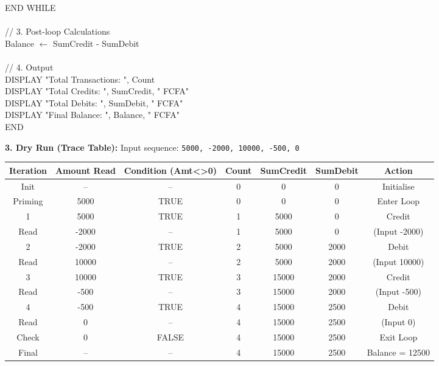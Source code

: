 \documentclass[11pt]{article}
\begin{document}
\begin{exoresolu}
\begin{flushleft}
\hspace{1em}END WHILE\\
\mbox{}\\
\hspace{1em}// 3. Post-loop Calculations\\
\hspace{1em}Balance $\leftarrow$ SumCredit - SumDebit\\
\mbox{}\\
\hspace{1em}// 4. Output\\
\hspace{1em}DISPLAY "Total Transactions: ", Count\\
\hspace{1em}DISPLAY "Total Credits: ", SumCredit, " FCFA"\\
\hspace{1em}DISPLAY "Total Debits: ", SumDebit, " FCFA"\\
\hspace{1em}DISPLAY "Final Balance: ", Balance, " FCFA"\\
END
\end{flushleft}

\noindent\textbf{3. Dry Run (Trace Table):}
Input sequence: \texttt{5000, -2000, 10000, -500, 0}

\begin{center}
\begin{tabular}{|c|c|c|c|c|c|c|}\hline
\rowcolor{popblueL}
\textbf{Iteration} & \textbf{Amount Read} & \textbf{Condition (Amt<>0)} & \textbf{Count} & \textbf{SumCredit} & \textbf{SumDebit} & \textbf{Action} \\ \hline
Init & -- & -- & 0 & 0 & 0 & Initialise \\ \hline
Priming & 5000 & TRUE & 0 & 0 & 0 & Enter Loop \\ \hline
1 & 5000 & TRUE & 1 & 5000 & 0 & Credit \\ \hline
Read & -2000 & -- & 1 & 5000 & 0 & (Input -2000) \\ \hline
2 & -2000 & TRUE & 2 & 5000 & 2000 & Debit \\ \hline
Read & 10000 & -- & 2 & 5000 & 2000 & (Input 10000) \\ \hline
3 & 10000 & TRUE & 3 & 15000 & 2000 & Credit \\ \hline
Read & -500 & -- & 3 & 15000 & 2000 & (Input -500) \\ \hline
4 & -500 & TRUE & 4 & 15000 & 2500 & Debit \\ \hline
Read & 0 & -- & 4 & 15000 & 2500 & (Input 0) \\ \hline
Check & 0 & FALSE & 4 & 15000 & 2500 & Exit Loop \\ \hline
Final & -- & -- & 4 & 15000 & 2500 & Balance = 12500 \\ \hline
\end{tabular}
\end{center}


\end{exoresolu}
\end{document}
